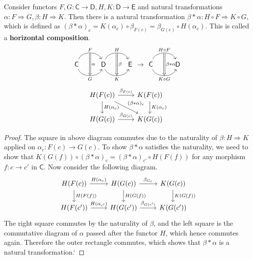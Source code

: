 \begin{lemma} Consider functors $F,G:\mathsf{C}\rightarrow \mathsf{D}, H,K:\mathsf{D}\rightarrow \mathsf{E}$ and natural transformations $\alpha:F\Rightarrow G, \beta:H\Rightarrow K$. Then there is a natural transformation $\beta*\alpha:H\circ F\Rightarrow K\circ G$, which is defined as $(\beta*\alpha)_c=K(\alpha_c)\circ \beta_{F(c)}=\beta_{G(c)}\circ H(\alpha_c)$. This is called a \textbf{horizontal composition}.
\begin{equation}
\begin{tikzcd} \mathsf{C}\arrow[r,bend left=70,"F"{name=f}] \arrow[r,swap, bend right=70, "G"{name=g}]  & \mathsf{D}\arrow[r,bend left=70,"H"{name=h}] \arrow[r,swap, bend right=70, "K"{name=k}]  \arrow[Rightarrow,from=f,to=g,"\alpha"]&\mathsf{E}\arrow[Rightarrow,from=h,to=k,"\beta"]
\end{tikzcd}\rightarrow
\begin{tikzcd} \mathsf{C}\arrow[r,bend left=70,"H\circ F"{name=f}] \arrow[r,swap, bend right=70, "K\circ G"{name=g}]  & \mathsf{D} \arrow[Rightarrow,from=f,to=g,"\beta*\alpha"]
\end{tikzcd}
\end{equation}
\begin{equation}
\begin{tikzcd}
H(F(c))\arrow[r,"\beta_{F(c)}"] \arrow[rd,"(\beta*\alpha)_c" ] \arrow[d,"H(\alpha_c)"] & K(F(c))\arrow[d,"K(\alpha_c)"]\\
H(G(c))\arrow[r,"\beta_{G(c)}"] & K(G(c))
\end{tikzcd}
\end{equation}
\end{lemma}
\begin{proof}
The square in above diagram commutes due to the naturality of $\beta:H\Rightarrow K$ applied on $\alpha_c:F(c)\rightarrow G(c)$. To show $\beta*\alpha$ satisfies the naturality, we need to show that $K(G(f))\circ (\beta*\alpha)_c=(\beta*\alpha)_{c'}\circ H(F(f))$ for any morphism $f:c\rightarrow c'$ in $\mathsf{C}$. Now consider the following diagram.
\begin{equation}
\begin{tikzcd}
H(F(c))\arrow[r,"H(\alpha_c)"] \arrow[d,"H(F(f))"] & H(G(c))\arrow[r,"\beta_{G_c}"] \arrow[d,"H(G(f))"] & K(G(c))\arrow[d,"K(G(f))"]\\
H(F(c'))\arrow[r,"H(\alpha_{c'})"] & H(G(c'))\arrow[r,"\beta_{G(c')}"] & K(G(c'))
\end{tikzcd}
\end{equation}
The right square commutes by the naturality of $\beta$, and the left square is the commutative diagram of $\alpha$ passed after the functor $H$, which hence commutes again. Therefore the outer rectangle commutes, which shows that $\beta*\alpha$ is a natural transformation.`
\end{proof}

